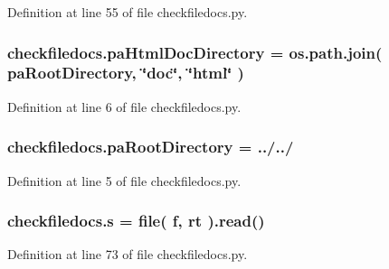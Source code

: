 Definition at line 55 of file checkfiledocs.\+py.

\subsubsection[{\texorpdfstring{pa\+Html\+Doc\+Directory}{paHtmlDocDirectory}}]{\setlength{\rightskip}{0pt plus 5cm}checkfiledocs.\+pa\+Html\+Doc\+Directory = os.\+path.\+join( {\bf pa\+Root\+Directory}, \char`\"{}doc\char`\"{}, \char`\"{}html\char`\"{} )}\hypertarget{namespacecheckfiledocs_a82b481f84a09a1fe21d675a6abdcbde7}{}\label{namespacecheckfiledocs_a82b481f84a09a1fe21d675a6abdcbde7}


Definition at line 6 of file checkfiledocs.\+py.

\subsubsection[{\texorpdfstring{pa\+Root\+Directory}{paRootDirectory}}]{ checkfiledocs.\+pa\+Root\+Directory = \textquotesingle{}../../\textquotesingle{}}\hypertarget{namespacecheckfiledocs_a071be53d3f9c9688874f32b6fa0c8cfe}{}\label{namespacecheckfiledocs_a071be53d3f9c9688874f32b6fa0c8cfe}


Definition at line 5 of file checkfiledocs.\+py.

\subsubsection[{\texorpdfstring{s}{s}}]{\setlength{\rightskip}{0pt plus 5cm}checkfiledocs.\+s = file( {\bf f}, \textquotesingle{}rt\textquotesingle{} ).read()}\hypertarget{namespacecheckfiledocs_aa41ee49d6195c9664c9f63b0ea875c6d}{}\label{namespacecheckfiledocs_aa41ee49d6195c9664c9f63b0ea875c6d}


Definition at line 73 of file checkfiledocs.\+py.

